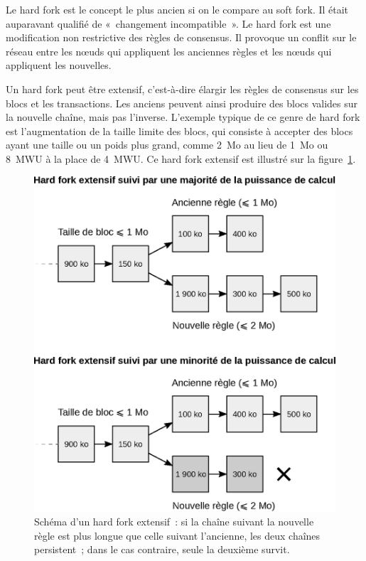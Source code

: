 Le hard fork est le concept le plus ancien si on le compare au soft fork. Il était auparavant qualifié de «~changement incompatible~». Le hard fork est une modification non restrictive des règles de consensus. Il provoque un conflit sur le réseau entre les nœuds qui appliquent les anciennes règles et les nœuds qui appliquent les nouvelles.

Un hard fork peut être extensif, c'est-à-dire élargir les règles de consensus sur les blocs et les transactions. Les anciens peuvent ainsi produire des blocs valides sur la nouvelle chaîne, mais pas l'inverse. L'exemple typique de ce genre de hard fork est l'augmentation de la taille limite des blocs, qui consiste à accepter des blocs ayant une taille ou un poids plus grand, comme 2~Mo au lieu de 1~Mo ou 8~MWU à la place de 4~MWU. Ce hard fork extensif est illustré sur la figure~\ref{fig:expanding-hard-fork}.

\begin{figure}[h]
  \centering
  \includegraphics[scale=0.65]{img/expanding-hard-fork-induced-forks.eps}
  \caption{Schéma d'un hard fork extensif~: si la chaîne suivant la nouvelle règle est plus longue que celle suivant l'ancienne, les deux chaînes persistent~; dans le cas contraire, seule la deuxième survit.}
  \label{fig:expanding-hard-fork}
\end{figure}

